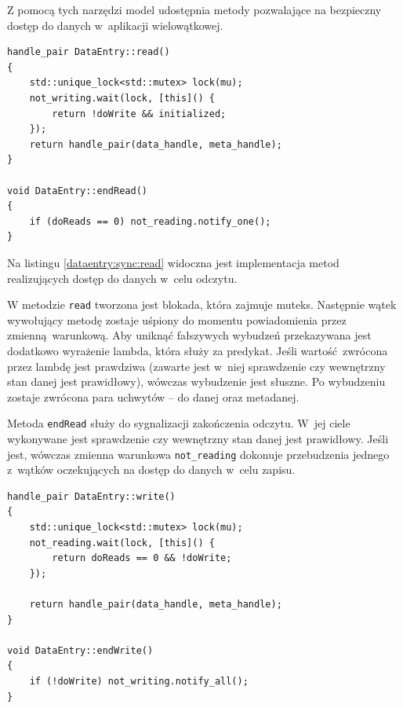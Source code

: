 Z pomocą tych narzędzi model udostępnia metody pozwalające na bezpieczny dostęp do danych w~aplikacji wielowątkowej.

\begin{minipage}{\textwidth}
	\begin{lstlisting}[label=dataentry:sync:read, caption={Metody klasy \lstinline$DataEntry$ zapewniające bezpieczny odczyt danych współdzielonych w~środowisku wielowątkowym.},alsoletter={()[].=}]
handle_pair DataEntry::read()
{
	std::unique_lock<std::mutex> lock(mu);
	not_writing.wait(lock, [this]() {
		return !doWrite && initialized;
	});
	return handle_pair(data_handle, meta_handle);
}

void DataEntry::endRead()
{
	if (doReads == 0) not_reading.notify_one();
}
	\end{lstlisting}
\end{minipage}

Na listingu \ref{dataentry:sync:read} widoczna jest implementacja metod realizujących dostęp do danych w~celu odczytu. 

W metodzie \lstinline$read$ tworzona jest blokada, która zajmuje muteks. Następnie wątek wywołujący metodę zostaje uśpiony do momentu powiadomienia przez zmienną warunkową. Aby uniknąć fałszywych wybudzeń przekazywana jest dodatkowo wyrażenie lambda, która służy za predykat. Jeśli wartość zwrócona przez lambdę jest prawdziwa (zawarte jest w~niej sprawdzenie czy wewnętrzny stan danej jest prawidłowy), wówczas wybudzenie jest słuszne. Po wybudzeniu zostaje zwrócona para uchwytów -- do danej oraz metadanej.

Metoda \lstinline$endRead$ służy do sygnalizacji zakończenia odczytu. W~jej ciele wykonywane jest sprawdzenie czy wewnętrzny stan danej jest prawidłowy. Jeśli jest, wówczas zmienna warunkowa \lstinline$not_reading$ dokonuje przebudzenia jednego z~wątków oczekujących na dostęp do danych w~celu zapisu.

\begin{minipage}{\textwidth}
	\begin{lstlisting}[label=dataentry:sync:write, caption={Metody klasy \lstinline$DataEntry$ zapewniające bezpieczny zapis danych współdzielonych w~środowisku wielowątkowym.},alsoletter={()[].=}]
handle_pair DataEntry::write()
{
	std::unique_lock<std::mutex> lock(mu);
	not_reading.wait(lock, [this]() {
		return doReads == 0 && !doWrite;
	});

	return handle_pair(data_handle, meta_handle);
}

void DataEntry::endWrite()
{
	if (!doWrite) not_writing.notify_all();
}
	\end{lstlisting}
\end{minipage}

